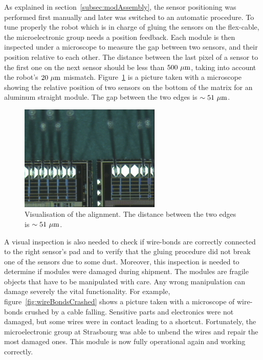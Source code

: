   As explained in section~\ref{subsec:modAssembly}, the sensor positioning was performed first manually and later was switched to an automatic procedure.
  To tune properly the robot which is in charge of gluing the sensors on the flex-cable, the microelectronic group needs a position feedback.
  Each module is then inspected under a microscope to measure the gap between two sensors, and their position relative to each other.
  The distance between the last pixel of a sensor to the first one on the next sensor should be less than $500~\mu\rm{m}$, taking into account the robot's $20~\mu\rm{m}$ mismatch.
  Figure~\ref{fig:visAlign} is a picture taken with a microscope showing the relative position of two sensors on the bottom of the matrix for an aluminum straight module.
  The gap between the two edges is $\sim 51~\mu\rm{m}$. 
  
  \begin{figure}[!tbh]
    \centering
    \includegraphics[width=0.6\textwidth]{Pictures/labTests/alignment_sensors.jpg}
    \caption{Visualisation of the alignment. The distance between the two edges is $\sim 51~\mu\rm{m}$.}
    \label{fig:visAlign}
  \end{figure}
  
  A visual inspection is also needed to check if wire-bonds are correctly connected to the right sensor's pad and to verify that the gluing procedure did not break one of the sensors due to some dust.
  Moreover, this inspection is needed to determine if modules were damaged during shipment.
  The modules are fragile objects that have to be manipulated with care.
  Any wrong manipulation can damage severely the vital functionality.
  For example, figure~\ref{fig:wireBondsCrashed} shows a picture taken with a microscope of  wire-bonds crushed by a cable falling.
  Sensitive parts and electronics were not damaged, but some wires were in contact leading to a shortcut.
  Fortunately, the microelectronic group at Strasbourg was able to unbend the wires and repair the most damaged ones.
  This module is now fully operational again and working correctly.

